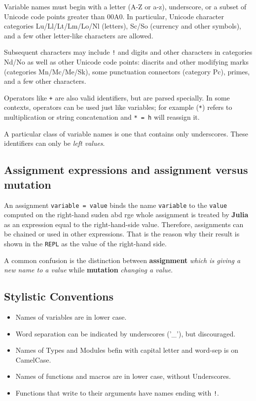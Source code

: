 \documentclass[
]{article}
\providecommand{\tightlist}{%
  \setlength{\itemsep}{0pt}\setlength{\parskip}{0pt}}
\begin{document}
Variable names must begin with a letter (A-Z or a-z), underscore, or a
subset of Unicode code points greater than 00A0. In particular, Unicode
character categories Lu/Ll/Lt/Lm/Lo/Nl (letters), Sc/So (currency and
other symbols), and a few other letter-like characters are allowed.

Subsequent characters may include \texttt{!} and digits and other
characters in categories Nd/No as well as other Unicode code points:
diacrits and other modifying marks (categories Mn/Mc/Me/Sk), some
punctuation connectors (category Pc), primes, and a few other
characters.

Operators like \texttt{+} are also valid identifiers, but are parsed
specially. In some contexts, operators can be used just like variables;
for example (\texttt{*}) refers to multiplication or string
concatenation and \texttt{*\ =\ h} will reassign it.

A particular class of variable names is one that contains only
underscores. These identifiers can only be \emph{left values}.

\hypertarget{assignment-expressions-and-assignment-versus-mutation}{%
\subsection{Assignment expressions and assignment versus
mutation}\label{assignment-expressions-and-assignment-versus-mutation}}

An assignment \texttt{variable\ =\ value} binds the name
\texttt{variable} to the \texttt{value} computed on the right-hand suden
abd rge whole assignment is treated by \textbf{Julia} as an expression
equal to the right-hand-side value. Therefore, assignments can be
chained or used in other expressions. That is the reason why their
result is shown in the \texttt{REPL} as the value of the right-hand
side.

A common confusion is the distinction between \textbf{assignment}
\emph{which is giving a new name to a value} while \textbf{mutation}
\emph{changing a value}.

\hypertarget{stylistic-conventions}{%
\subsection{Stylistic Conventions}\label{stylistic-conventions}}

\begin{itemize}
\tightlist
\item
  Names of variables are in lower case.
\item
  Word separation can be indicated by underscores ('\_'), but
  discouraged.
\item
  Names of Types and Modules befin with capital letter and word-sep is
  on CamelCase.
\item
  Names of functions and macros are in lower case, without Underscores.
\item
  Functions that write to their arguments have names ending with
  \texttt{!}.
\end{itemize}
\end{document}
